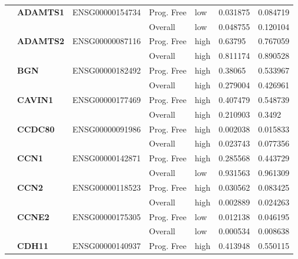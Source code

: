 \begin{spacing}{1}
{\begin{longtable}{|>{\bfseries}p{2cm}|>{\bfseries}p{1.9cm}|p{2.8cm}|p{2cm}|p{2cm}|p{1.5cm}|p{1.5cm}|}
            \multirow{2}{3cm}{False}
             & ADAMTS1  & ENSG00000154734 & Prog. Free & low  & 0.031875 & 0.084719 \\
            \hhline{~~~----}
             &          &                 & Overall    & low  & 0.048755 & 0.120104 \\
            \hhline{~======}
             & ADAMTS2  & ENSG00000087116 & Prog. Free & high & 0.63795  & 0.767059 \\
            \hhline{~~~----}
             &          &                 & Overall    & high & 0.811174 & 0.890528 \\
            \hhline{~======}
             & BGN      & ENSG00000182492 & Prog. Free & high & 0.38065  & 0.533967 \\
            \hhline{~~~----}
             &          &                 & Overall    & high & 0.279004 & 0.426961 \\
            \hhline{~======}
             & CAVIN1   & ENSG00000177469 & Prog. Free & high & 0.407479 & 0.548739 \\
            \hhline{~~~----}
             &          &                 & Overall    & high & 0.210903 & 0.3492   \\
            \hhline{~======}
             & CCDC80   & ENSG00000091986 & Prog. Free & high & 0.002038 & 0.015833 \\
            \hhline{~~~----}
             &          &                 & Overall    & high & 0.023743 & 0.077356 \\
            \hhline{~======}
             & CCN1     & ENSG00000142871 & Prog. Free & high & 0.285568 & 0.443729 \\
            \hhline{~~~----}
             &          &                 & Overall    & low  & 0.931563 & 0.961309 \\
            \hhline{~======}
             & CCN2     & ENSG00000118523 & Prog. Free & high & 0.030562 & 0.083425 \\
            \hhline{~~~----}
             &          &                 & Overall    & high & 0.002889 & 0.024263 \\
            \hhline{~======}
             & CCNE2    & ENSG00000175305 & Prog. Free & low  & 0.012138 & 0.046195 \\
            \hhline{~~~----}
             &          &                 & Overall    & low  & 0.000534 & 0.008638 \\
            \hhline{~======}
             & CDH11    & ENSG00000140937 & Prog. Free & high & 0.413948 & 0.550115 \\

\end{longtable}}
\end{spacing}
